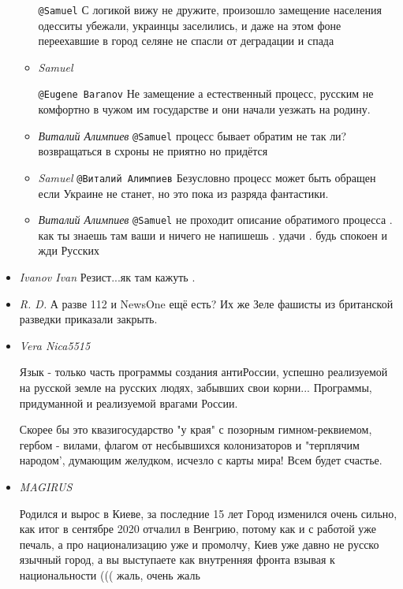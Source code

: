 \begin{itemize}
\begin{itemize}
\verb|@Samuel|  С логикой вижу не дружите, произошло замещение населения одесситы
убежали, украинцы заселились,  и даже на этом фоне переехавшие в город селяне
не спасли от деградации и спада


\item \emph{Samuel}

\verb|@Eugene Baranov|  Не замещение а естественный процесс, русским не
комфортно в чужом им государстве и они начали уезжать на родину.

\item \emph{Виталий Алимпиев}
\verb|@Samuel|  процесс бывает обратим не так ли? возвращаться в схроны не приятно но придётся

\item \emph{Samuel}
\verb|@Виталий Алимпиев|  Безусловно процесс может быть обращен если Украине не
станет, но это пока из разряда фантастики.

\item \emph{Виталий Алимпиев}
\verb|@Samuel|   не проходит описание обратимого процесса . как ты знаешь там
ваши и ничего не напишешь . удачи . будь спокоен и жди Русских

\end{itemize}

\item \emph{Ivanov Ivan}
Резист...як там кажуть .

\item \emph{R. D.}
А разве 112 и NewsOne ещё есть? Их же Зеле фашисты из британской разведки приказали закрыть.

\item \emph{Vera Nica5515}

Язык - только часть программы создания антиРоссии, успешно реализуемой на
русской земле на русских людях, забывших свои корни... Программы, придуманной и
реализуемой врагами России. 

Скорее бы это квазигосударство "у края" с позорным гимном-реквиемом, гербом -
вилами, флагом от несбывшихся колонизаторов и "терплячим народом', думающим
желудком, исчезло с карты мира! Всем будет счастье.

\item \emph{MAGIRUS}

Родился и вырос в Киеве, за последние 15 лет Город изменился очень сильно, как
итог в сентябре 2020 отчалил в Венгрию, потому как и с работой уже печаль, а
про национализацию уже и промолчу, Киев уже давно не русско язычный  город, а
вы выступаете как внутренняя фронта взывая к национальности ((( жаль, очень
жаль


\end{itemize}

